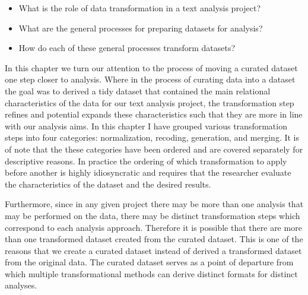 \documentclass[
  letterpaper,
]{latex/krantz}
\providecommand{\tightlist}{%
  \setlength{\itemsep}{0pt}\setlength{\parskip}{0pt}}\usepackage{longtable,booktabs,array}
\begin{document}
\begin{tcolorbox}[enhanced jigsaw, colbacktitle=quarto-callout-note-color!10!white, arc=.35mm, toprule=.15mm, breakable, colframe=quarto-callout-note-color-frame, bottomrule=.15mm, opacitybacktitle=0.6, coltitle=black, titlerule=0mm, colback=white, toptitle=1mm, bottomtitle=1mm, title=\textcolor{quarto-callout-note-color}{\faInfo}\hspace{0.5em}{Keys}, rightrule=.15mm, leftrule=.75mm, opacityback=0, left=2mm]

\begin{itemize}
\tightlist
\item
  What is the role of data transformation in a text analysis project?
\item
  What are the general processes for preparing datasets for analysis?
\item
  How do each of these general processes transform datasets?
\end{itemize}

\end{tcolorbox}

In this chapter we turn our attention to the process of moving a curated
dataset one step closer to analysis. Where in the process of curating
data into a dataset the goal was to derived a tidy dataset that
contained the main relational characteristics of the data for our text
analysis project, the transformation step refines and potential expands
these characteristics such that they are more in line with our analysis
aims. In this chapter I have grouped various transformation steps into
four categories: normalization, recoding, generation, and merging. It is
of note that the these categories have been ordered and are covered
separately for descriptive reasons. In practice the ordering of which
transformation to apply before another is highly idiosyncratic and
requires that the researcher evaluate the characteristics of the dataset
and the desired results.

Furthermore, since in any given project there may be more than one
analysis that may be performed on the data, there may be distinct
transformation steps which correspond to each analysis approach.
Therefore it is possible that there are more than one transformed
dataset created from the curated dataset. This is one of the reasons
that we create a curated dataset instead of derived a transformed
dataset from the original data. The curated dataset serves as a point of
departure from which multiple transformational methods can derive
distinct formats for distinct analyses.
\end{document}
